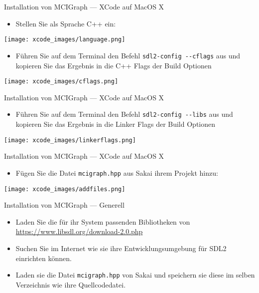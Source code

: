 \documentclass[presentation]{beamer}
\begin{document}
\begin{frame}[label={sec:orgf908702},fragile]{Installation von MCIGraph --- XCode auf MacOS X}
 \begin{itemize}
\item Stellen Sie als Sprache C++ ein:
\end{itemize}
\begin{center}
\texttt{[image: xcode\_images/language.png]}
\end{center}
\begin{itemize}
\item Führen Sie auf dem Terminal den Befehl {\color{solarizedYellow}\verb!sdl2-config --cflags!} aus und
kopieren Sie das Ergebnis in die C++ Flags der Build Optionen
\end{itemize}
\begin{center}
\texttt{[image: xcode\_images/cflags.png]}
\end{center}
\end{frame}
\begin{frame}[label={sec:orgc43a366},fragile]{Installation von MCIGraph --- XCode auf MacOS X}
 \begin{itemize}
\item Führen Sie auf dem Terminal den Befehl {\color{solarizedYellow}\verb!sdl2-config --libs!} aus und
kopieren Sie das Ergebnis in die Linker Flags der Build Optionen
\end{itemize}
\begin{center}
\texttt{[image: xcode\_images/linkerflags.png]}
\end{center}
\end{frame}
\begin{frame}[label={sec:orgdffc5d6},fragile]{Installation von MCIGraph --- XCode auf MacOS X}
 \begin{itemize}
\item Fügen Sie die Datei {\color{solarizedYellow}\verb!mcigraph.hpp!} aus Sakai ihrem Projekt hinzu:
\end{itemize}
\begin{center}
\texttt{[image: xcode\_images/addfiles.png]}
\end{center}
\end{frame}
\begin{frame}[label={sec:orgf10e68e},fragile]{Installation von MCIGraph --- Generell}
 \begin{itemize}
\item Laden Sie die für ihr System passenden Bibliotheken von
\url{https://www.libsdl.org/download-2.0.php}
\item Suchen Sie im Internet wie sie ihre Entwicklungsumgebung für SDL2
einrichten können.
\item Laden sie die Datei {\color{solarizedYellow}\verb!mcigraph.hpp!} von Sakai und speichern sie diese
im selben Verzeichnis wie ihre Quellcodedatei.
\end{itemize}
\end{frame}
\end{document}
